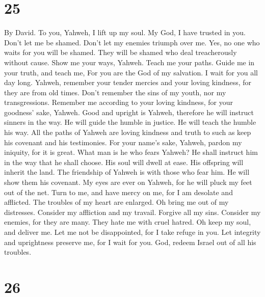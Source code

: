 \hypertarget{section-24}{%
\section{25}\label{section-24}}

By David.  To you, Yahweh, I lift up my soul.
 My God, I have trusted in you. Don't let me be shamed.
Don't let my enemies triumph over me.  Yes, no one who
waits for you will be shamed. They will be shamed who deal treacherously
without cause.  Show me your ways, Yahweh. Teach me your
paths.  Guide me in your truth, and teach me, For you are
the God of my salvation. I wait for you all day long. 
Yahweh, remember your tender mercies and your loving kindness, for they
are from old times.  Don't remember the sins of my youth,
nor my transgressions. Remember me according to your loving kindness,
for your goodness' sake, Yahweh.  Good and upright is
Yahweh, therefore he will instruct sinners in the way.  He
will guide the humble in justice. He will teach the humble his way.
 All the paths of Yahweh are loving kindness and truth to
such as keep his covenant and his testimonies.  For your
name's sake, Yahweh, pardon my iniquity, for it is great.
 What man is he who fears Yahweh? He shall instruct him
in the way that he shall choose.  His soul will dwell at
ease. His offspring will inherit the land.  The
friendship of Yahweh is with those who fear him. He will show them his
covenant.  My eyes are ever on Yahweh, for he will pluck
my feet out of the net.  Turn to me, and have mercy on
me, for I am desolate and afflicted.  The troubles of my
heart are enlarged. Oh bring me out of my distresses. 
Consider my affliction and my travail. Forgive all my sins.
 Consider my enemies, for they are many. They hate me
with cruel hatred.  Oh keep my soul, and deliver me. Let
me not be disappointed, for I take refuge in you.  Let
integrity and uprightness preserve me, for I wait for you.
 God, redeem Israel out of all his troubles.

\hypertarget{section-25}{%
\section{26}\label{section-25}}

